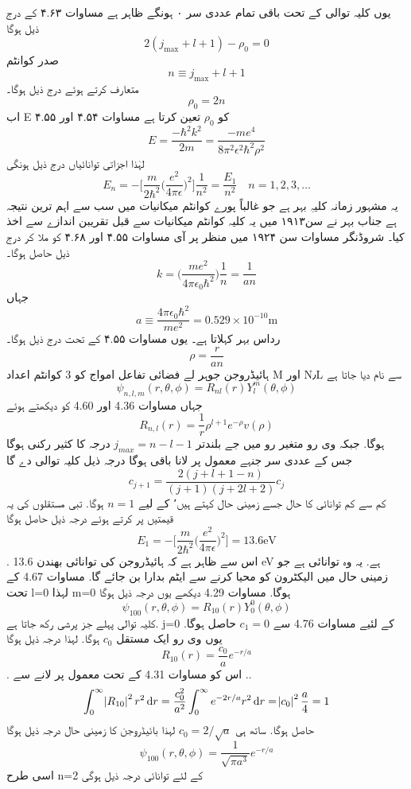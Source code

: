 \documentclass{book}
\begin{document}
 یوں کلیہ توالی کے تحت باقی تمام عددی سر ۰ ہونگے ظاہر ہے مساوات ۴.۶۳ کے درج ذیل ہوگا
 \[2(j_{\text{max}}+l+1)-\rho_{0}=0\]
 صدر کوانٹم 
 \[n\equiv j_{\text{max}}+l+1\]
 متعارف کرتے ہوئے درج ذیل ہوگا۔
 \[\rho_{0}=2n\]
 اب E کو 
 \(\rho_{0}\)
 تعین کرتا ہے مساوات ۴.۵۴ اور ۴.۵۵
 \[E=\frac{-\hbar^{2}k^{2}}{2m}=\frac{-me^{4}}{8\pi^{2}\epsilon^{2}\hbar^{2}\rho^{2}}\]
 لہٰذا اجزاتی توانائیاں درج ذیل ہونگی 
 \[\boxed{E_{n}=-\big[\frac{m}{2\hbar^{2}}\big(\frac{e^{2}}{4\pi\epsilon}\big)^{2}\big]\frac{1}{n^{2}}=\frac{E_{1}}{n^{2}}\quad n=1,2,3,\dotsc}\]
 یہ مشہور زمانہ کلیہِ بہر ہے جو غالباً پورے کوانٹم میکانیات میں  سب سے اہم ترین نتیجہ ہے جناب بہر نے سن۱۹۱۳ میں یہ کلیہ کوانٹم میکانیات سے قبل تقریبن اندازے سے اخذ کیا۔ شروڈنگر مساوات سن ۱۹۲۴ میں منظر پر آی مساوات  ۴.۵۵ اور ۴.۶۸ کو ملا کر درج ذیل حاصل ہوگا۔
\[k=\big(\frac{me^{2}}{4\pi\epsilon_{0}\hbar^{2}}\big)\frac{1}{n}=\frac{1}{an}\]
جہاں
\[\boxed{a\equiv\frac{4\pi\epsilon_{0}\hbar^{2}}{me^{2}}=0.529\times 10^{-10}\text{m}}\]
رداس بہر کہلاتا ہے۔ یوں مساوات ۴.۵۵ کے تحت درج ذیل ہوگا۔
\[\rho=\frac{r}{an}\]
ہائیڈروجن جوہر لے فضائی تفاعل  امواج کو 3 کوانٹم اعداد M اور N٫L سے نام دیا جاتا ہے 
 \[\psi_{n,l,m}(r,\theta,\phi)=R_{nl}(r)Y_{l}^{m}(\theta,\phi)\]
 جہاں مساوات 4.36 اور 4.60 کو دیکھتے ہوئے
 \[R_{n,l}(r)=\frac{1}{r}\rho^{l+1}e^{-\rho}v(\rho)\] 
 ہوگا. جبکہ وی رو متغير رو میں جے بلندتر
\(j_{max}=n-l-1\)
درجہ کا كثير رکنی ہوگا جس کے عددی سر جنہے معمول پر لانا باقی ہوگا  درجہ ذیل کلیہ توالی دے گا
 \[c_{j+1}=\frac{2(j+l+1-n)}{(j+1)(j+2l+2)}c_{j}\]
كم سے كم توانائی کا حال جسے زمینی حال کہتے ہیں٬ کے لیے
 \(n=1\) 
ہوگا. تبی مستقلوں کی یہ قیمتیں پر کرتے ہوئے درجہ ذیل حاصل ہوگا
 \[\boxed{E_{1}=-\big[\frac{m}{2\hbar^{2}}\big(\frac{e^{2}}{4\pi\epsilon}\big)^{2}\big]=13.6\text{eV}}\]
. اس سے ظاہر ہے کہ  ہائیڈروجن کی توانائی بھندن 13.6 eV ہے. یہ وہ توانائی ہے جو زمینی حال میں الیکٹرون کو محیا کرنے سے ایٹم بدارا بن جائے گا. مساوات 4.67 کے تحت l=0  لہذا m=0  ہوگا. مساوات 4.29 دیکھے یوں درجہ ذیل ہوگا
 \[\psi_{100}(r,\theta,\phi)=R_{10}(r)Y_{0}^{0}(\theta,\phi)\]
 کلیہ توالی پہلے جز پرشی رکھ جاتا ہے. j=0 کے لئیے مساوات 4.76 سے
 \(c_{1}=0\) 
 حاصل ہوگا. یوں وی رو ایک مستقل 
  \(c_{0}\)
  ہوگا. لہذا درجہ ذیل ہوگا
   \[R_{10}(r)=\frac{c_{0}}{a}e^{-r/a}\]
  . اس کو مساوات 4.31 کے تحت معمول پر لانے
سے
..\[\int_{0}^{\infty}\abs{R_{10}}^{2}r^{2}\dif{r}=\frac{c_{0}^{2}}{a^{2}}\int_{0}^{\infty}e^{-2r/a}r^{2}\dif{r}=\abs{c_{0}}^{2}\frac{a}{4}=1\]
حاصل ہوگا. ساتھ ہی
\(c_{0}=2/\sqrt{a}\)
لہذا بائیڈروجن کا زمینی حال درجہ ذیل ہوگا
\[\psi_{100}(r,\theta,\phi)=\frac{1}{\sqrt{\pi a^{3}}}e^{-r/a}\]
اسی طرح n=2  کے لئے توانائی درجہ ذیل ہوگی
\end{document}

